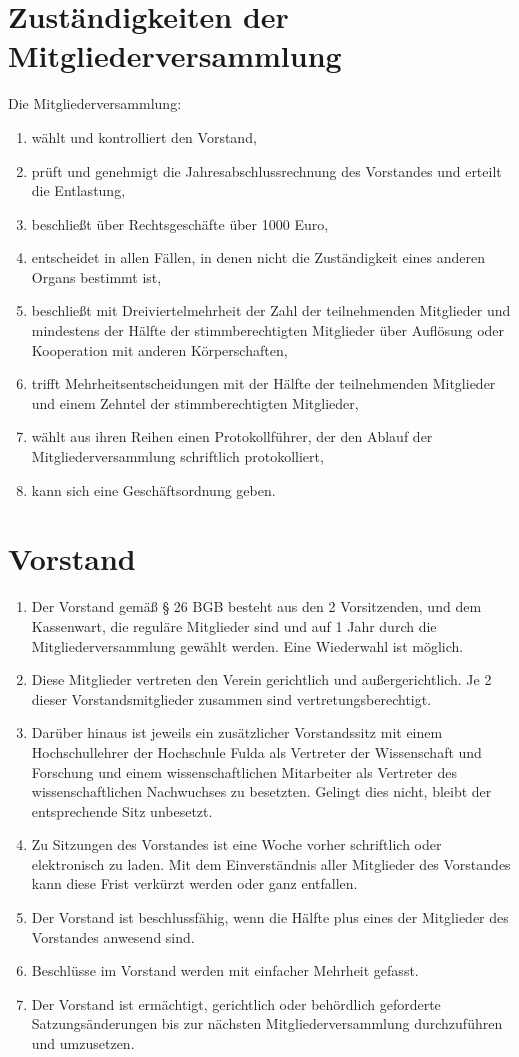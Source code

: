 \documentclass[ngerman]{article}
\begin{document}
\section{Zuständigkeiten der Mitgliederversammlung}
Die Mitgliederversammlung:
\begin{enumerate}
\item wählt und kontrolliert den Vorstand,
\item prüft und genehmigt die Jahresabschlussrechnung des Vorstandes und erteilt die Entlastung,
\item beschließt über Rechtsgeschäfte über 1000 Euro,
\item entscheidet in allen Fällen, in denen nicht die Zuständigkeit eines anderen Organs bestimmt ist,
\item beschließt mit Dreiviertelmehrheit der Zahl der teilnehmenden Mitglieder und mindestens der Hälfte der stimmberechtigten Mitglieder über Auflösung oder Kooperation mit anderen Körperschaften,
\item trifft Mehrheitsentscheidungen mit der Hälfte der teilnehmenden Mitglieder und einem Zehntel der stimmberechtigten Mitglieder,
\item wählt aus ihren Reihen einen Protokollführer, der den Ablauf der Mitgliederversammlung schriftlich protokolliert,
\item kann sich eine Geschäftsordnung geben.
\end{enumerate}

\section{Vorstand}
\begin{enumerate}
\item Der Vorstand gemäß § 26 BGB besteht aus den 2 Vorsitzenden, und dem Kassenwart, die reguläre Mitglieder sind und auf 1 Jahr durch die Mitgliederversammlung gewählt werden. Eine Wiederwahl ist möglich.
\item Diese Mitglieder vertreten den Verein gerichtlich und außergerichtlich. Je 2 dieser Vorstandsmitglieder zusammen sind vertretungsberechtigt.
\item Darüber hinaus ist jeweils ein zusätzlicher Vorstandssitz mit einem Hochschullehrer der Hochschule Fulda als Vertreter der Wissenschaft
und Forschung und einem wissenschaftlichen Mitarbeiter als Vertreter des wissenschaftlichen Nachwuchses zu besetzten. Gelingt dies nicht,
bleibt der entsprechende Sitz unbesetzt.
\item Zu Sitzungen des Vorstandes ist eine Woche vorher schriftlich oder elektronisch zu laden. Mit dem Einverständnis aller Mitglieder des
Vorstandes kann diese Frist verkürzt werden oder ganz entfallen.
\item Der Vorstand ist beschlussfähig, wenn die Hälfte plus eines der Mitglieder des Vorstandes anwesend sind.
\item Beschlüsse im Vorstand werden mit einfacher Mehrheit gefasst.
\item Der Vorstand ist ermächtigt, gerichtlich oder behördlich geforderte Satzungsänderungen bis zur nächsten Mitgliederversammlung durchzuführen und umzusetzen.
\end{enumerate}
\end{document}
